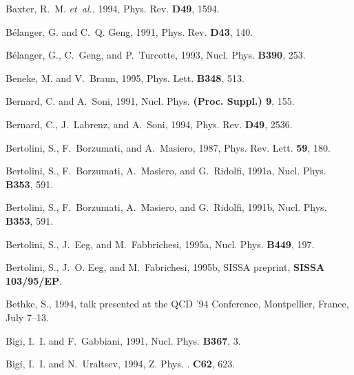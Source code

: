 \begin{thebibliography}{\protect{}1991}
Baxter, R.~M. {\em et~al.\/}, 1994,
\newblock Phys. Rev. {\bf D49}, 1594.

B{\'e}langer, G. and C.~Q. Geng, 1991,
\newblock Phys. Rev. {\bf D43}, 140.

B{\'e}langer, G., C.~Geng, and P.~Turcotte, 1993,
\newblock Nucl. Phys. {\bf B390}, 253.

Beneke, M. and V.~Braun, 1995,
\newblock Phys. Lett. {\bf B348}, 513.

Bernard, C. and A.~Soni, 1991,
\newblock Nucl. Phys. {\bf (Proc. Suppl.) 9}, 155.

Bernard, C., J.~Labrenz, and A.~Soni, 1994,
\newblock Phys. Rev. {\bf D49}, 2536.

Bertolini, S., F.~Borzumati, and A.~Masiero, 1987,
\newblock Phys. Rev. Lett. {\bf 59}, 180.

Bertolini, S., F.~Borzumati, A.~Masiero, and G.~Ridolfi, 1991a,
\newblock Nucl. Phys. {\bf B353}, 591.

Bertolini, S., F.~Borzumati, A.~Masiero, and G.~Ridolfi, 1991b,
\newblock Nucl. Phys. {\bf B353}, 591.

Bertolini, S., J.~Eeg, and M.~Fabbrichesi, 1995a,
\newblock Nucl. Phys. {\bf B449}, 197.

Bertolini, S., J.~O. Eeg, and M.~Fabrichesi, 1995b,
\newblock SISSA preprint, {\bf SISSA 103/95/EP}.

Bethke, S., 1994,
\newblock talk presented at the QCD '94 Conference, Montpellier, France, July
  7--13.

Bigi, I.~I. and F.~Gabbiani, 1991,
\newblock Nucl. Phys. {\bf B367}, 3.

Bigi, I.~I. and N.~Uraltsev, 1994,
\newblock Z. Phys. . {\bf C62}, 623.


\end{thebibliography}
